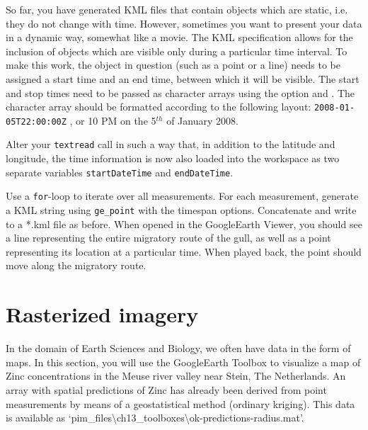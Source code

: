 \noindent So far, you have generated KML files that contain objects which are static, i.e. they do not change with time. However, sometimes you want to present your data in a dynamic way, somewhat like a movie. The KML specification allows for the inclusion of objects which are visible only during a particular time interval. To make this work, the object in question (such as a point or a line) needs to be assigned a start time and an end time, between which it will be visible. The start and stop times need to be passed as character arrays using the option {\tt {}} and {\tt {}}. The character array should be formatted according to the following layout: {\tt 2008-01-05T22:00:00Z} , or 10 PM on the 5$^{th}$ of January 2008.

\begin{action}
Alter your {\tt textread} call in such a way that, in addition to the latitude and longitude, the time information is now also loaded into the workspace as two separate variables {\tt startDateTime} and {\tt endDateTime}.
\end{action}

\begin{action}
Use a {\tt for}-loop to iterate over all measurements. For each measurement, generate a KML string using {\tt ge\_point} with the timespan options. Concatenate and write to a *.kml file as before. When opened in the GoogleEarth Viewer, you should see a line representing the entire migratory route of the gull, as well as a point representing its location at a particular time. When played back, the point should move along the migratory route.
\end{action}


\vspace{-2em}

\section{Rasterized imagery}
In the domain of Earth Sciences and Biology, we often have data in the form of maps. In this section, you will use the GoogleEarth Toolbox to visualize a map of Zinc concentrations in the Meuse river valley near Stein, The Netherlands. An array with spatial predictions of Zinc has already been derived from point measurements by means of a geostatistical method (ordinary kriging). This data is available as `pim\_files\textbackslash{}ch13\_toolboxes\textbackslash{}ok-predictions-radius.mat'.


